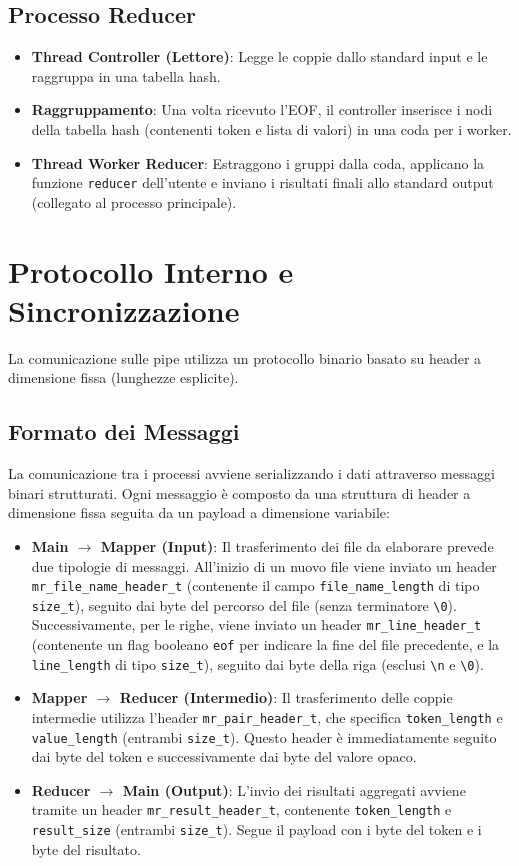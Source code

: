 \documentclass[12pt,a4paper]{article}
\begin{document}
\subsection{Processo Reducer}
\begin{itemize}
    \item \textbf{Thread Controller (Lettore)}: Legge le coppie dallo standard input e le raggruppa in una tabella hash.
    \item \textbf{Raggruppamento}: Una volta ricevuto l'EOF, il controller inserisce i nodi della tabella hash (contenenti token e lista di valori) in una coda per i worker.
    \item \textbf{Thread Worker Reducer}: Estraggono i gruppi dalla coda, applicano la funzione \texttt{reducer} dell'utente e inviano i risultati finali allo standard output (collegato al processo principale).
\end{itemize}

\section{Protocollo Interno e Sincronizzazione}
La comunicazione sulle pipe utilizza un protocollo binario basato su header a dimensione fissa (lunghezze esplicite).

\subsection{Formato dei Messaggi}
La comunicazione tra i processi avviene serializzando i dati attraverso messaggi binari strutturati. Ogni messaggio è composto da una struttura di header a dimensione fissa seguita da un payload a dimensione variabile:

\begin{itemize}
    \item \textbf{Main $\rightarrow$ Mapper (Input)}: Il trasferimento dei file da elaborare prevede due tipologie di messaggi. All'inizio di un nuovo file viene inviato un header \texttt{mr\_file\_name\_header\_t} (contenente il campo \texttt{file\_name\_length} di tipo \texttt{size\_t}), seguito dai byte del percorso del file (senza terminatore \texttt{\textbackslash 0}). Successivamente, per le righe, viene inviato un header \texttt{mr\_line\_header\_t} (contenente un flag booleano \texttt{eof} per indicare la fine del file precedente, e la \texttt{line\_length} di tipo \texttt{size\_t}), seguito dai byte della riga (esclusi \texttt{\textbackslash n} e \texttt{\textbackslash 0}).
    \item \textbf{Mapper $\rightarrow$ Reducer (Intermedio)}: Il trasferimento delle coppie intermedie utilizza l'header \texttt{mr\_pair\_header\_t}, che specifica \texttt{token\_length} e \texttt{value\_length} (entrambi \texttt{size\_t}). Questo header è immediatamente seguito dai byte del token e successivamente dai byte del valore opaco.
    \item \textbf{Reducer $\rightarrow$ Main (Output)}: L'invio dei risultati aggregati avviene tramite un header \texttt{mr\_result\_header\_t}, contenente \texttt{token\_length} e \texttt{result\_size} (entrambi \texttt{size\_t}). Segue il payload con i byte del token e i byte del risultato.
\end{itemize}
\end{document}
